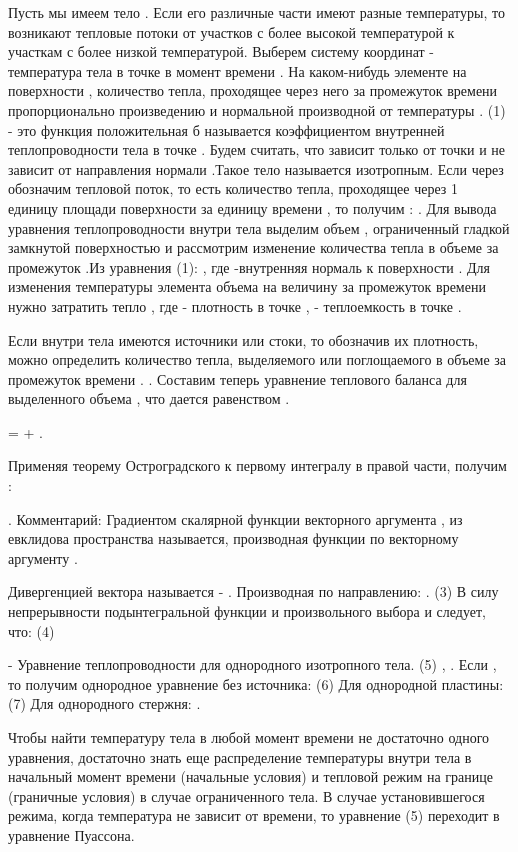 Пусть мы имеем тело  . Если его различные части имеют разные температуры, то возникают тепловые потоки от участков с более высокой температурой к участкам с более низкой температурой. Выберем систему координат  - температура тела в точке   в момент времени  .
На каком-нибудь элементе   на поверхности  , количество тепла, проходящее через него за промежуток времени   пропорционально произведению  и нормальной производной   от температуры  .
 											(1)
 - это функция   положительная б называется коэффициентом внутренней теплопроводности тела в точке  .
Будем считать, что   зависит только от точки   и не зависит от направления нормали  .Такое тело называется изотропным. 
Если через   обозначим тепловой поток, то есть количество тепла, проходящее через 1 единицу площади поверхности за единицу времени , то получим :
 .
Для вывода уравнения теплопроводности внутри тела   выделим объем  , ограниченный гладкой замкнутой поверхностью   и рассмотрим изменение количества тепла в объеме за промежуток  .Из уравнения (1):
   ,
где  -внутренняя нормаль к поверхности  .
Для изменения температуры элемента объема   на величину   за промежуток времени   нужно затратить тепло 
 ,
где  - плотность   в точке  ,
        - теплоемкость   в точке  .

 
Если внутри тела имеются источники или стоки, то обозначив   их плотность, можно определить количество тепла, выделяемого или поглощаемого в объеме   за промежуток времени  .
 .
Составим теперь уравнение теплового баланса для выделенного объема   , что дается равенством   .
  
 =  + .

Применяя теорему Остроградского к первому интегралу в правой части, получим :

  .
Комментарий:
Градиентом скалярной функции   векторного аргумента  , из евклидова пространства   называется, производная функции   по векторному аргументу  .
 
Дивергенцией вектора   называется -  .
Производная по направлению: .
 		(3)
В силу непрерывности подынтегральной функции и произвольного выбора   и   следует, что: 
 									(4)
 
  - Уравнение теплопроводности для однородного изотропного тела.
 								(5)
 ,  .
Если  , то получим однородное уравнение без источника:
  									(6) 
Для однородной пластины:
  										(7)
Для однородного стержня:
 .

Чтобы найти температуру тела в любой момент времени не достаточно одного уравнения, достаточно знать еще распределение температуры внутри тела в начальный момент времени (начальные условия) и тепловой режим на границе   (граничные условия)  в случае ограниченного тела.
В случае установившегося режима, когда температура не зависит от времени, то уравнение (5) переходит в уравнение Пуассона.
 
